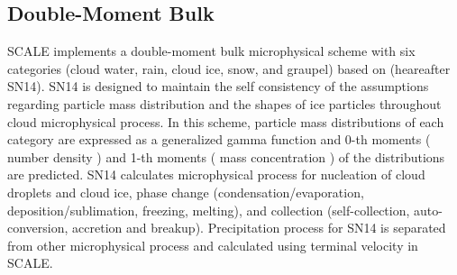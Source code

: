 \subsection{Double-Moment Bulk \cite{sn_2014}}

SCALE implements a double-moment bulk microphysical scheme with six categories (cloud water, rain, cloud ice, snow, and graupel) 
based on \cite{sn_2014} (heareafter SN14).
SN14 is designed to maintain the self consistency of the assumptions regarding particle mass distribution and
the shapes of ice particles throughout cloud microphysical process.
In this scheme, particle mass distributions of each category are expressed as a generalized gamma function and 0-th moments ( number density ) and
1-th moments ( mass concentration ) of the distributions are predicted. 
SN14 calculates microphysical process for nucleation of cloud droplets and cloud ice,
phase change (condensation/evaporation, deposition/sublimation, freezing, melting), and
collection (self-collection, auto-conversion, accretion and breakup).
Precipitation process for SN14 is separated from other microphysical process and calculated using terminal velocity in SCALE.

